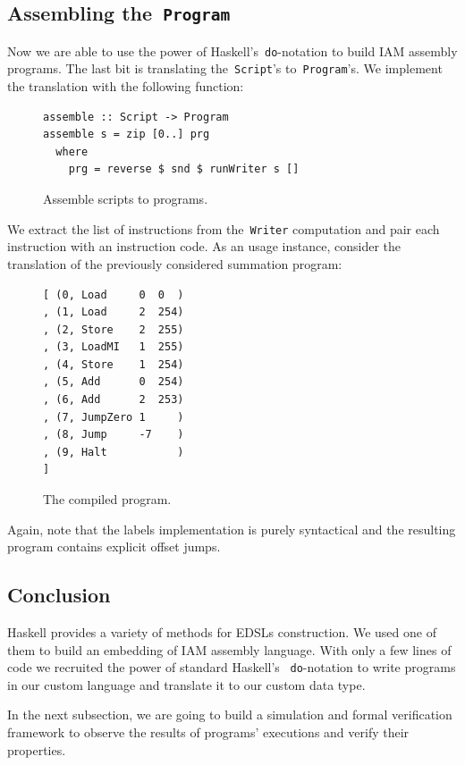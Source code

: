 \subsection{Assembling the~\texttt{Program}}

Now we are able to use the power of Haskell's~\texttt{do}-notation to
build IAM assembly programs. The last bit is translating
the~\texttt{Script}'s to~\texttt{Program}'s. We implement the
translation with the following function:

\begin{figure}[H]
\begin{verbatim}
assemble :: Script -> Program
assemble s = zip [0..] prg
  where
    prg = reverse $ snd $ runWriter s []
\end{verbatim}
\caption{Assemble scripts to programs.}
\end{figure}

We extract the list of instructions from the~\texttt{Writer} computation
and pair each instruction with an instruction code. As an usage instance, consider the
translation of the previously considered summation program:

\begin{figure}[H]
\begin{verbatim}
[ (0, Load     0  0  )
, (1, Load     2  254)
, (2, Store    2  255)
, (3, LoadMI   1  255)
, (4, Store    1  254)
, (5, Add      0  254)
, (6, Add      2  253)
, (7, JumpZero 1     )
, (8, Jump     -7    )
, (9, Halt           )
]
\end{verbatim}
\caption{The compiled program.}
\end{figure}

Again, note that the labels implementation is purely syntactical and the resulting
program contains explicit offset jumps.

\subsection{Conclusion}

Haskell provides a variety of methods for EDSLs construction.
We used one of them to build an embedding of IAM assembly language.
With only a few lines of code we recruited the power of standard Haskell's
~\texttt{do}-notation to write programs in our custom language and
translate it to our custom data type.

In the next subsection, we are going to build a simulation and formal verification
framework to observe the results of programs' executions and verify their properties.


